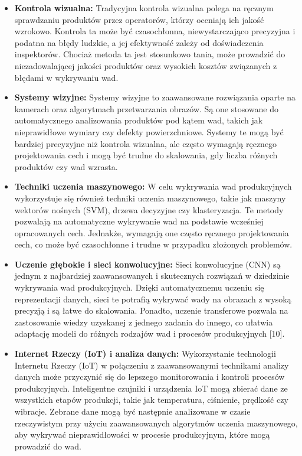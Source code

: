 \begin{itemize}
    \item \textbf{Kontrola wizualna:} Tradycyjna kontrola wizualna polega na ręcznym sprawdzaniu produktów przez operatorów, którzy oceniają ich jakość wzrokowo. Kontrola ta może być czasochłonna, niewystarczająco precyzyjna i podatna na błędy ludzkie, a jej efektywność zależy od doświadczenia inspektorów. Chociaż metoda ta jest stosunkowo tania, może prowadzić do niezadowalającej jakości produktów oraz wysokich kosztów związanych z błędami w wykrywaniu wad.
    \item \textbf{Systemy wizyjne:} Systemy wizyjne to zaawansowane rozwiązania oparte na kamerach oraz algorytmach przetwarzania obrazów. Są one stosowane do automatycznego analizowania produktów pod kątem wad, takich jak nieprawidłowe wymiary czy defekty powierzchniowe. Systemy te mogą być bardziej precyzyjne niż kontrola wizualna, ale często wymagają ręcznego projektowania cech i mogą być trudne do skalowania, gdy liczba różnych produktów czy wad wzrasta.
    \item \textbf{Techniki uczenia maszynowego:} W celu wykrywania wad produkcyjnych wykorzystuje się również techniki uczenia maszynowego, takie jak maszyny wektorów nośnych (SVM), drzewa decyzyjne czy klasteryzacja. Te metody pozwalają na automatyczne wykrywanie wad na podstawie wcześniej opracowanych cech. Jednakże, wymagają one często ręcznego projektowania cech, co może być czasochłonne i trudne w przypadku złożonych problemów.
    \item \textbf{Uczenie głębokie i sieci konwolucyjne:} Sieci konwolucyjne (CNN) są jednym z najbardziej zaawansowanych i skutecznych rozwiązań w dziedzinie wykrywania wad produkcyjnych. Dzięki automatycznemu uczeniu się reprezentacji danych, sieci te potrafią wykrywać wady na obrazach z wysoką precyzją i są łatwe do skalowania. Ponadto, uczenie transferowe pozwala na zastosowanie wiedzy uzyskanej z jednego zadania do innego, co ułatwia adaptację modeli do różnych rodzajów wad i procesów produkcyjnych [10].
    \item \textbf{Internet Rzeczy (IoT) i analiza danych:} Wykorzystanie technologii Internetu Rzeczy (IoT) w połączeniu z zaawansowanymi technikami analizy danych może przyczynić się do lepszego monitorowania i kontroli procesów produkcyjnych. Inteligentne czujniki i urządzenia IoT mogą zbierać dane ze wszystkich etapów produkcji, takie jak temperatura, ciśnienie, prędkość czy wibracje. Zebrane dane mogą być następnie analizowane w czasie rzeczywistym przy użyciu zaawansowanych algorytmów uczenia maszynowego, aby wykrywać nieprawidłowości w procesie produkcyjnym, które mogą prowadzić do wad.
\end{itemize}

